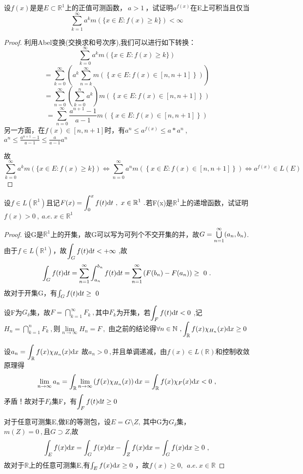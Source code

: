 设$f(x)$是是$E \subset \mathbb{R}^1$上的正值可测函数，$\ a>1\ $，试证明$a^{f(x)}$在E上可积当且仅当$$\sum_{k=1}^{\infty} a^km\left(\{x \in E:f(x) \geq k \}\right)<\infty$$
\begin{proof}
利用Abel变换(交换求和号次序),我们可以进行如下转换：
$$\sum_{k=0}^{\infty}a^km(\{x\in E:f(x)\geq k\})$$
$$=\sum_{k=0}^{\infty}\left(a^k\sum_{n=k}^{\infty}m\left(\ \{\ x\in E:f(x)\in[n,n+1]\ \}\ \right)\right)$$
$$=\sum_{n=0}^{\infty}\left(\sum_{k=0}^{n}a^k\right)m\left(\ \{\ x\in E:f(x)\in[n,n+1]\ \}\ \right)$$$$=\sum_{n=0}^{\infty}\frac{a^{n+1}-1}{a-1}m\left(\ \{\ x\in E:f(x)\in[n,n+1]\ \}\ \right)$$
另一方面，在$f(x)\in[n,n+1]$时，有$a^n\leq a^{f(x)}\leq a*a^{n}\ $,$a^n\leq \frac{a^{n+1}-1}{a-1}\leq \frac{a}{a-1}a^n$	\par 
故$$\sum_{k=0}^{\infty}a^km(\{x\in E:f(x)\geq k\})\iff\sum_{n=0}^{\infty}a^n m(\ \{\ x\in E:f(x)\in[n,n+1]\ \}\ )\iff a^{f(x)}\in L(E)$$
\end{proof}


设$f\in L(\mathbb{R}^1)$且记$F(x)=\displaystyle{\int_{0}^{x}f(t)\di{t}}\ ,\ x \in \mathbb{R}^1\ .$若F(x)是$\mathbb{R}^1$上的递增函数，试证明$f(x)>0\ ,\ a.e.\ x \in \mathbb{R}^1$
\begin{proof}
设G是$\mathbb{R}^1$上的开集，故G可以写为可列个不交开集的并，故$G=\bigcup\limits\limits_{n=1}^{\infty}(a_n,b_n)$.由于$f\in L(\mathbb{R}^1)$，故$\displaystyle{\int_Gf(t)\di{t}}<+\infty\ $,故$$\int_Gf(t)\mathrm{d}t=\sum_{n=1}^{\infty}\int_{a_n}^{b_n}f(t)\mathrm{d}t=\sum_{n=1}^{\infty}\left(F(b_n)-F(a_n)\right)\geq \ 0 \ .$$
故对于开集G，有$\int_Gf(t)\mathrm{d}t\geq\ 0$\par 
设F为$G_{\delta}$集，故$F=\bigcap\limits_{k=1}^{\infty}F_k\ ,$其中$F_k$为开集，若$\displaystyle{\int_Ff(t)\di{t}<0}\ $,记$H_n=\bigcap\limits_{k=1}^{n}F_k\ ,$则$\lim\limits_{n\to\infty}H_n=F\ ,$ 由之前的结论得$\forall n\in \mathbb{N}\ , \displaystyle{\int_{\mathbb{R}}f(x)\chi_{H_n}(x)\mathrm{d}x}\geq0$ \par
设$a_n=\displaystyle{\int_{\mathbb{R}}f(x)\chi_{H_n}(x)\di{x}}\ $故$a_n>0\ ,$并且单调递减，由$f(x)\in  L(\mathbb{R})$和控制收敛原理得$$\lim\limits_{n\to\infty}a_n=\int_{\mathbb{R}}\lim\limits_{n\to\infty}\left(f(x)\chi_{H_n}(x)\right)\di{x}=\int_{\mathbb{R}}f(x)\chi_{F}(x)\di{x}<0\ ,$$矛盾！故对于$F_{\delta}$集F，有$\displaystyle{\int_Ff(t)\mathrm{d}t}\geq0\ $\par 
对于任意可测集E,做E的等测包，设$E=G\setminus Z,\ $其中G为$G_{\delta}$集，$m(Z)=0\ ,且G \supset Z$,故$$\int_E f(x)\di{x}=\int_G f(x)\di{x}-\int_Z f(x)\di{x}=\int_G f(x)\di{x}\geq0\ ,$$故对于$\mathbb{R}$上的任意可测集E,有$\int_E f(x)\di{x}\geq0\ $，故$f(x)\geq0,\ \ a.e.\ x \in \mathbb{R}$
\end{proof}


